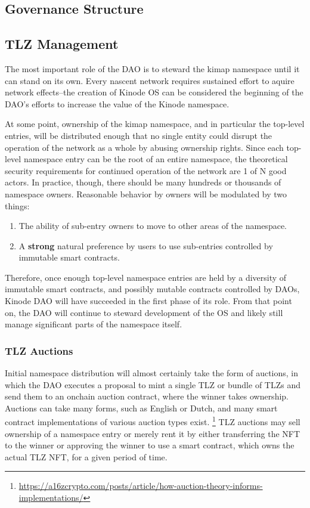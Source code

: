 \documentclass[runningheads]{llncs}
\begin{document}
\subsection{Governance Structure}
\label{sec:daogovernance}

\subsection{TLZ Management}
\label{sec:daotldmanagement}

The most important role of the DAO is to steward the kimap namespace until it can stand on its own.
Every nascent network requires sustained effort to aquire network effects–the creation of Kinode OS can be considered the beginning of the DAO's efforts to increase the value of the Kinode namespace.

At some point, ownership of the kimap namespace, and in particular the top-level entries, will be distributed enough that no single entity could disrupt the operation of the network as a whole by abusing ownership rights.
Since each top-level namespace entry can be the root of an entire namespace, the theoretical security requirements for continued operation of the network are 1 of N good actors.
In practice, though, there should be many hundreds or thousands of namespace owners.
Reasonable behavior by owners will be modulated by two things:
\begin{enumerate}
    \item The ability of sub-entry owners to move to other areas of the namespace.
    \item A \textbf{strong} natural preference by users to use sub-entries controlled by immutable smart contracts.
\end{enumerate}

Therefore, once enough top-level namespace entries are held by a diversity of immutable smart contracts, and possibly mutable contracts controlled by DAOs, Kinode DAO will have succeeded in the first phase of its role.
From that point on, the DAO will continue to steward development of the OS and likely still manage significant parts of the namespace itself.

\subsubsection{TLZ Auctions}
\label{sec:daotldauctions}

Initial namespace distribution will almost certainly take the form of auctions, in which the DAO executes a proposal to mint a single TLZ or bundle of TLZs and send them to an onchain auction contract, where the winner takes ownership.
Auctions can take many forms, such as English or Dutch, and many smart contract implementations of various auction types exist.
\footnote{\url{https://a16zcrypto.com/posts/article/how-auction-theory-informs-implementations/}}
TLZ auctions may sell ownership of a namespace entry or merely rent it by either transferring the NFT to the winner or approving the winner to use a smart contract, which owns the actual TLZ NFT, for a given period of time.
\end{document}
